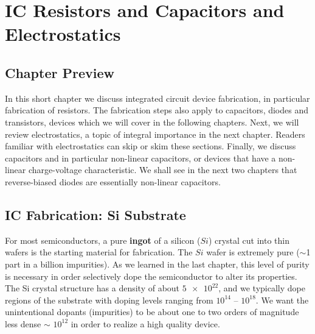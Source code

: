 \chapter{IC Resistors and Capacitors and Electrostatics}
\label{ch:ch04_ic_tech}
\graphicspath{{./figs_ic_tech/}}
\section{Chapter Preview}
In this short chapter we discuss integrated circuit device fabrication, in particular fabrication of resistors.  The fabrication steps also apply to capacitors, diodes and transistors, devices which we will cover in the following chapters.  Next, we will review electrostatics, a topic of integral importance in the next chapter.  Readers familiar with electrostatics can skip or skim these sections.  Finally, we discuss capacitors and in particular non-linear capacitors, or devices that have a non-linear charge-voltage characteristic.  We shall see in the next two chapters that reverse-biased diodes are essentially non-linear capacitors.
\section{IC Fabrication: Si Substrate}
For most semiconductors, a pure \textbf{ingot} of a silicon ($Si$) crystal cut into thin wafers is the starting material for fabrication.  The $Si$ wafer is extremely pure ($\sim$1 part in a billion impurities).  As we learned in the last chapter, this level of purity is necessary in order selectively dope the semiconductor to alter its properties.  The Si crystal structure has a density of about $\num{5e22}$, and we typically dope regions of the substrate with doping levels ranging from  $10^{14}$ – $10^{18}$.  We want the unintentional dopants (impurities) to be about one to two orders of magnitude less dense $\sim$ $10^{12}$ in order to realize a high quality device.  

